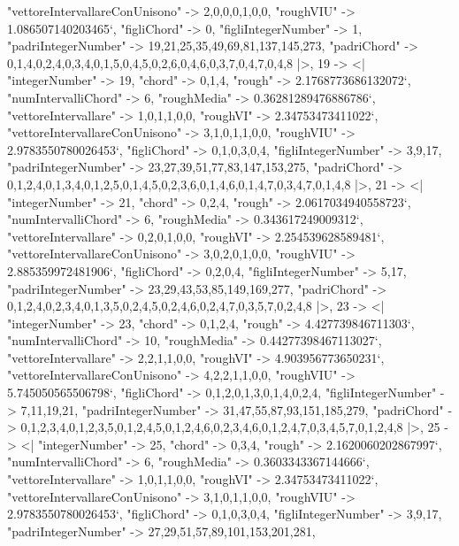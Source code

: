 \documentclass[
]{article}
\begin{document}
\begin{DatasetVerbatim}
    "vettoreIntervallareConUnisono" -> {2,0,0,0,1,0,0},
    "roughVIU" -> 1.086507140203465`,
    "figliChord" -> {{0}},
    "figliIntegerNumber" -> {1},
    "padriIntegerNumber" -> {19,21,25,35,49,69,81,137,145,273},
    "padriChord" -> {{0,1,4},{0,2,4},{0,3,4},{0,1,5},{0,4,5},{0,2,6},{0,4,6},{0,3,7},{0,4,7},{0,4,8}}
  |>,
  19 -> <|
    "integerNumber" -> 19,
    "chord" -> {0,1,4},
    "rough" -> 2.1768773686132072`,
    "numIntervalliChord" -> 6,
    "roughMedia" -> 0.36281289476886786`,
    "vettoreIntervallare" -> {1,0,1,1,0,0},
    "roughVI" -> 2.34753473411022`,
    "vettoreIntervallareConUnisono" -> {3,1,0,1,1,0,0},
    "roughVIU" -> 2.9783550780026453`,
    "figliChord" -> {{0,1},{0,3},{0,4}},
    "figliIntegerNumber" -> {3,9,17},
    "padriIntegerNumber" -> {23,27,39,51,77,83,147,153,275},
    "padriChord" -> {{0,1,2,4},{0,1,3,4},{0,1,2,5},{0,1,4,5},{0,2,3,6},{0,1,4,6},{0,1,4,7},{0,3,4,7},{0,1,4,8}}
  |>,
  21 -> <|
    "integerNumber" -> 21,
    "chord" -> {0,2,4},
    "rough" -> 2.0617034940558723`,
    "numIntervalliChord" -> 6,
    "roughMedia" -> 0.343617249009312`,
    "vettoreIntervallare" -> {0,2,0,1,0,0},
    "roughVI" -> 2.254539628589481`,
    "vettoreIntervallareConUnisono" -> {3,0,2,0,1,0,0},
    "roughVIU" -> 2.885359972481906`,
    "figliChord" -> {{0,2},{0,4}},
    "figliIntegerNumber" -> {5,17},
    "padriIntegerNumber" -> {23,29,43,53,85,149,169,277},
    "padriChord" -> {{0,1,2,4},{0,2,3,4},{0,1,3,5},{0,2,4,5},{0,2,4,6},{0,2,4,7},{0,3,5,7},{0,2,4,8}}
  |>,
  23 -> <|
    "integerNumber" -> 23,
    "chord" -> {0,1,2,4},
    "rough" -> 4.427739846711303`,
    "numIntervalliChord" -> 10,
    "roughMedia" -> 0.44277398467113027`,
    "vettoreIntervallare" -> {2,2,1,1,0,0},
    "roughVI" -> 4.903956773650231`,
    "vettoreIntervallareConUnisono" -> {4,2,2,1,1,0,0},
    "roughVIU" -> 5.745050565506798`,
    "figliChord" -> {{0,1,2},{0,1,3},{0,1,4},{0,2,4}},
    "figliIntegerNumber" -> {7,11,19,21},
    "padriIntegerNumber" -> {31,47,55,87,93,151,185,279},
    "padriChord" -> {{0,1,2,3,4},{0,1,2,3,5},{0,1,2,4,5},{0,1,2,4,6},{0,2,3,4,6},{0,1,2,4,7},{0,3,4,5,7},{0,1,2,4,8}}
  |>,
  25 -> <|
    "integerNumber" -> 25,
    "chord" -> {0,3,4},
    "rough" -> 2.1620060202867997`,
    "numIntervalliChord" -> 6,
    "roughMedia" -> 0.3603343367144666`,
    "vettoreIntervallare" -> {1,0,1,1,0,0},
    "roughVI" -> 2.34753473411022`,
    "vettoreIntervallareConUnisono" -> {3,1,0,1,1,0,0},
    "roughVIU" -> 2.9783550780026453`,
    "figliChord" -> {{0,1},{0,3},{0,4}},
    "figliIntegerNumber" -> {3,9,17},
    "padriIntegerNumber" -> {27,29,51,57,89,101,153,201,281},

\end{DatasetVerbatim}
\end{document}
